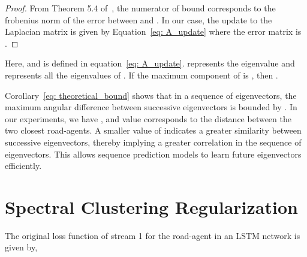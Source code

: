 \documentclass[10pt,twocolumn,letterpaper]{article}
\theoremstyle{plain}
\begin{document}
\begin{proof}
From Theorem 5.4 of~\cite{demmel1997applied}, the numerator of bound corresponds to the frobenius norm of the error between  and . In our case, the update to the Laplacian matrix is given by Equation~\ref{eq: A_update} where the error matrix is . 
\end{proof}


\noindent Here,  and  is defined in equation~\ref{eq: A_update}.  represents the  eigenvalue and  represents all the eigenvalues of . If the maximum component of  is , then .

Corollary~\ref{eq: theoretical_bound} shows that in a sequence of  eigenvectors, the maximum angular difference between successive eigenvectors is bounded by . In our experiments, we have , and  value corresponds to the distance between the two closest road-agents. A smaller value of  indicates a greater similarity between successive eigenvectors, thereby implying a greater correlation in the sequence of eigenvectors. This allows sequence prediction models to learn future eigenvectors efficiently.

 \section{Spectral Clustering Regularization}
\label{sec: spectral_clustering}



The original loss function of stream 1 for the  road-agent in an LSTM network is given by,
\end{document}
